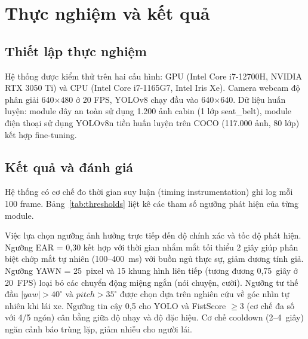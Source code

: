 \section{Thực nghiệm và kết quả}

\subsection{Thiết lập thực nghiệm}

Hệ thống được kiểm thử trên hai cấu hình: GPU (Intel Core i7-12700H, NVIDIA RTX 3050 Ti) và CPU (Intel Core i7-1165G7, Intel Iris Xe). Camera webcam độ phân giải 640$\times$480 ở 20 FPS, YOLOv8 chạy đầu vào 640$\times$640. Dữ liệu huấn luyện: module dây an toàn sử dụng 1.200 ảnh cabin (1 lớp seat\_belt), module điện thoại sử dụng YOLOv8n tiền huấn luyện trên COCO (117.000 ảnh, 80 lớp) kết hợp fine-tuning.

\subsection{Kết quả và đánh giá}

Hệ thống có cơ chế đo thời gian suy luận (timing instrumentation) ghi log mỗi 100 frame. Bảng~\ref{tab:thresholds} liệt kê các tham số ngưỡng phát hiện của từng module.

Việc lựa chọn ngưỡng ảnh hưởng trực tiếp đến độ chính xác và tốc độ phát hiện. Ngưỡng EAR = 0,30 kết hợp với thời gian nhắm mắt tối thiểu 2 giây giúp phân biệt chớp mắt tự nhiên (100--400~ms) với buồn ngủ thực sự, giảm dương tính giả. Ngưỡng YAWN = 25~pixel và 15 khung hình liên tiếp (tương đương 0,75~giây ở 20~FPS) loại bỏ các chuyển động miệng ngắn (nói chuyện, cười). Ngưỡng tư thế đầu $|yaw| > 40^\circ$ và $pitch > 35^\circ$ được chọn dựa trên nghiên cứu về góc nhìn tự nhiên khi lái xe. Ngưỡng tin cậy 0,5 cho YOLO và FistScore $\geq 3$ (cơ chế đa số với 4/5 ngón) cân bằng giữa độ nhạy và độ đặc hiệu. Cơ chế cooldown (2--4~giây) ngăn cảnh báo trùng lặp, giảm nhiễu cho người lái.

